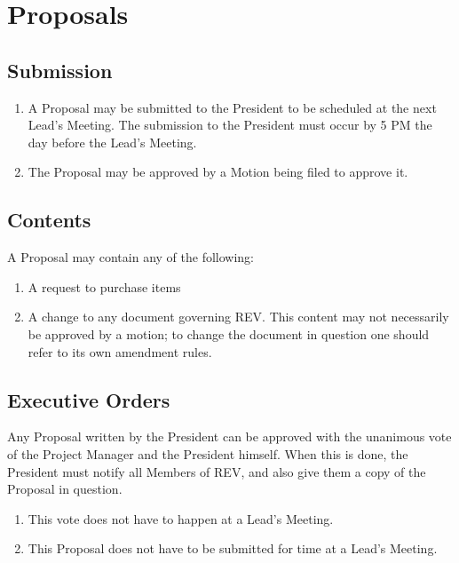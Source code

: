 \section{Proposals}
\label{proposals}

\subsection{Submission}
\label{proposals:submission}

\begin{enumerate}
\item A Proposal may be submitted to the President to be scheduled at the next Lead's Meeting. The submission to the President must occur by 5 PM the day before the Lead's Meeting.
\item The Proposal may be approved by a Motion being filed to approve it.
\end{enumerate}

\subsection{Contents}
\label{proposals:contents}

A Proposal may contain any of the following:

\begin{enumerate}
\item A request to purchase items
\item A change to any document governing REV. This content may not necessarily be approved by a motion; to change the document in question one should refer to its own amendment rules.
\end{enumerate}


\subsection{Executive Orders}
\label{proposals:eo}

Any Proposal written by the President can be approved with the unanimous vote of the Project Manager and the President himself. When this is done, the President must notify all Members of REV, and also give them a copy of the Proposal in question.

\begin{enumerate}
\item This vote does not have to happen at a Lead's Meeting.
\item This Proposal does not have to be submitted for time at a Lead's Meeting.
\end{enumerate}